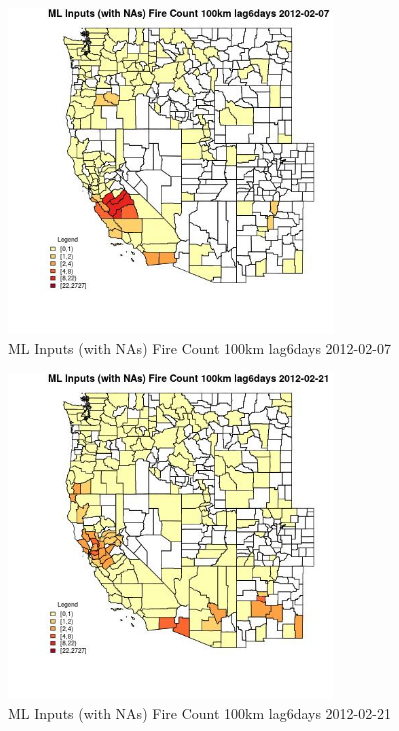 \begin{figure} 
\centering  
\includegraphics[width=0.77\textwidth]{Code_Outputs/Report_ML_input_PM25_Step4_part_f_de_duplicated_aves_prioritize_24hr_obswNAs_CountyFire_Count_100km_lag6daysMean2012-02-07.jpg} 
\caption{\label{fig:Report_ML_input_PM25_Step4_part_f_de_duplicated_aves_prioritize_24hr_obswNAsCountyFire_Count_100km_lag6daysMean2012-02-07}ML Inputs (with NAs) Fire Count 100km lag6days 2012-02-07} 
\end{figure} 
 

\begin{figure} 
\centering  
\includegraphics[width=0.77\textwidth]{Code_Outputs/Report_ML_input_PM25_Step4_part_f_de_duplicated_aves_prioritize_24hr_obswNAs_CountyFire_Count_100km_lag6daysMean2012-02-21.jpg} 
\caption{\label{fig:Report_ML_input_PM25_Step4_part_f_de_duplicated_aves_prioritize_24hr_obswNAsCountyFire_Count_100km_lag6daysMean2012-02-21}ML Inputs (with NAs) Fire Count 100km lag6days 2012-02-21} 
\end{figure} 
 

